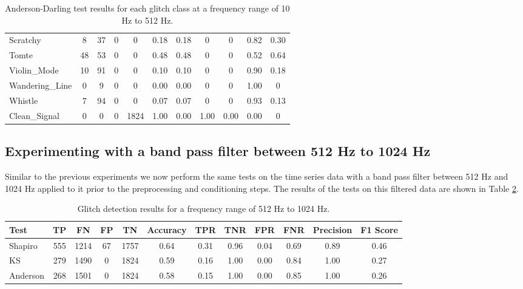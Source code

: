 \documentclass[12pt]{article}
\begin{document}
\begin{table}[H]
\begin{tabular}{lcccccccccc}
  Scratchy & 8 & 37 & 0 & 0 & 0.18 & 0.18 & 0 & 0 & 0.82 & 0.30 \\
  Tomte & 48 & 53 & 0 & 0 & 0.48 & 0.48 & 0 & 0 & 0.52 & 0.64 \\
  Violin\_Mode & 10 & 91 & 0 & 0 & 0.10 & 0.10 & 0 & 0 & 0.90 & 0.18 \\
  Wandering\_Line & 0 & 9 & 0 & 0 & 0.00 & 0.00 & 0 & 0 & 1.00 & 0 \\
  Whistle & 7 & 94 & 0 & 0 & 0.07 & 0.07 & 0 & 0 & 0.93 & 0.13 \\
  Clean\_Signal & 0 & 0 & 0 & 1824 & 1.00 & 0.00 & 1.00 & 0.00 & 0.00 & 0 \\
  \bottomrule
  \end{tabular}
  \caption{Anderson-Darling test results for each glitch class at a frequency range of 10 Hz to 512 Hz.}
  \label{tab:ad_low_frequency_results}
\end{table}

\subsection{Experimenting with a band pass filter between 512 Hz to 1024 Hz}\label{Experiment_3}

\noindent Similar to the previous experiments we now perform the same tests on the time series data with a band pass filter between 512 Hz and 1024 Hz applied to it prior to the preprocessing and conditioning steps. The results of the tests on this filtered data are shown in Table \ref{tab:high_frequency_results}.

\begin{table}[H]
  \centering
  \begin{tabular}{lccccccccccc}
  \toprule
  Test & TP & FN & FP & TN & Accuracy & TPR & TNR & FPR & FNR & Precision & F1 Score \\
  \midrule
  Shapiro & 555 & 1214 & 67 & 1757 & 0.64 & 0.31 & 0.96 & 0.04 & 0.69 & 0.89 & 0.46 \\
  KS & 279 & 1490 & 0 & 1824 & 0.59 & 0.16 & 1.00 & 0.00 & 0.84 & 1.00 & 0.27 \\
  Anderson & 268 & 1501 & 0 & 1824 & 0.58 & 0.15 & 1.00 & 0.00 & 0.85 & 1.00 & 0.26 \\
  \bottomrule
  \end{tabular}
  \caption{Glitch detection results for a frequency range of 512 Hz to 1024 Hz.}
  \label{tab:high_frequency_results}
\end{table}
\end{document}

